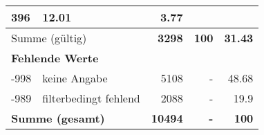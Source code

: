 \begin{longtable}{lXrrr}
       \num{396} &
       \num[round-mode=places,round-precision=2]{12,01} &
         \num[round-mode=places,round-precision=2]{3,77} \\
     \midrule
     \multicolumn{2}{l}{Summe (gültig)} &
       \textbf{\num{3298}} &
     \textbf{100} &
       \textbf{\num[round-mode=places,round-precision=2]{31,43}} \\
     \multicolumn{5}{l}{\textbf{Fehlende Werte}}\\
       -998 &
       keine Angabe &
         \num{5108} &
        - &
         \num[round-mode=places,round-precision=2]{48,68} \\
       -989 &
       filterbedingt fehlend &
         \num{2088} &
        - &
         \num[round-mode=places,round-precision=2]{19,9} \\
     \midrule
     \multicolumn{2}{l}{\textbf{Summe (gesamt)}} &
          \textbf{\num{10494}} &
        \textbf{-} &
        \textbf{100} \\
     \bottomrule
     \end{longtable}
     

